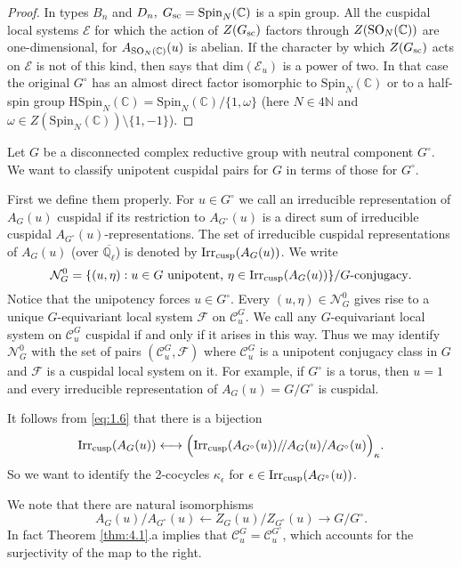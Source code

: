 \documentclass[11pt]{amsart}
\theoremstyle{definition}
\newcommand{\mr}{\mathrm}
\newcommand{\N}{\mathbb N}
\newcommand{\Q}{\mathbb Q}
\newcommand{\C}{\mathbb C}
\newcommand{\q}{/\!/}
\def\Irr{{\rm Irr}}
\def\SO{{\rm SO}}
\def\cC{{\mathcal C}}
\def\cN{{\mathcal N}}
\def\cE{{\mathcal E}}
\def\cF{{\mathcal F}}
\def\sc{{\rm sc}}
\def\cusp{{\rm cusp}}
\begin{document}
\begin{proof}
In types $B_n$ and $D_n ,\; G_\sc = \mathrm{Spin}_N (\C)$ is a spin group. All the
cuspidal local systems $\cE$ for which the action of $Z(G_\sc)$ factors through 
$Z(\SO_N (\C))$ are one-dimensional, for $A_{\SO_N (\C)}(u)$ is abelian.
If the character by which $Z(G_\sc)$ acts on $\cE$ is not of this kind, then
\cite[Proposition 14.4]{Lus1} says that dim$(\cE_u)$ is a power of two. In that case
the original $G^\circ$ has an almost direct factor isomorphic to $\mr{Spin}_N (\C)$ or 
to a half-spin group $\mathrm{HSpin}_N (\C) = \mathrm{Spin}_N (\C) / \{1,\omega\}$ 
(here $N \in 4 \N$ and $\omega \in Z(\mathrm{Spin}_N (\C)) \setminus \{1,-1\}$). 
\end{proof}

Let $G$ be a disconnected complex reductive group with neutral component $G^\circ$.
We want to classify unipotent cuspidal pairs for $G$ in terms of those for $G^\circ$.

First we define them properly. For $u \in G^\circ$ we call an irreducible 
representation of $A_G (u)$ cuspidal if its restriction to $A_{G^\circ}(u)$ is a 
direct sum of irreducible cuspidal $A_{G^\circ}(u)$-representations. The set of
irreducible cuspidal representations of $A_G (u)$ (over $\overline{\Q_{\ell}}$) is
denoted by $\Irr_\cusp (A_G (u))$. We write
\[
\cN_G^0 = \{ (u,\eta) : u \in G \text{ unipotent, } \eta \in \Irr_\cusp (A_G (u)) \} 
/ G\text{-conjugacy} .
\]
Notice that the unipotency forces $u \in G^\circ$. Every $(u,\eta) \in \cN_G^0$
gives rise to a unique $G$-equivariant local system $\cF$ on $\cC_u^G$. We call any
$G$-equivariant local system on $\cC_u^G$ cuspidal if and only if it arises in this
way. Thus we may identify $\cN_G^0$ with the set of pairs $(\cC_u^G,\cF)$ where
$\cC_u^G$ is a unipotent conjugacy class in $G$ and $\cF$ is a cuspidal local
system on it.
For example, if $G^\circ$ is a torus, then $u=1$ and every irreducible representation
of $A_G (u) = G / G^\circ$ is cuspidal.

It follows from \eqref{eq:1.6} that there is a bijection
\[
\Irr_\cusp (A_G (u)) \longleftrightarrow \Big( \Irr_\cusp (A_{G^\circ}(u)) \q 
A_G (u) / A_{G^\circ}(u) \Big)_\kappa .
\]
So we want to identify the 2-cocycles $\kappa_\epsilon$ for $\epsilon \in 
\Irr_\cusp (A_{G^\circ}(u))$.

We note that there are natural isomorphisms
\begin{equation}\label{eq:4.1}
A_G (u) / A_{G^\circ} (u) \leftarrow Z_G (u) / Z_{G^\circ}(u) \to G / G^\circ . 
\end{equation}
In fact Theorem \ref{thm:4.1}.a implies that $\cC_u^G = \cC_u^{G^\circ}$,
which accounts for the surjectivity of the map to the right.
\end{document}

